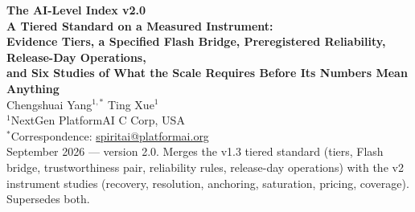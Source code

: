 \documentclass[11pt]{article}
\theoremstyle{definition}
\begin{document}
\begin{center}
{\LARGE\bfseries The AI-Level Index v2.0}\\[6pt]
{\large\bfseries A Tiered Standard on a Measured Instrument:\\[2pt] Evidence Tiers, a Specified Flash Bridge, Preregistered Reliability, Release-Day Operations,\\[2pt] and Six Studies of What the Scale Requires Before Its Numbers Mean Anything}\\[14pt]
{\large Chengshuai Yang$^{1,*}$ \quad Ting Xue$^{1}$}\\[5pt]
{\normalsize $^{1}$NextGen PlatformAI C Corp, USA}\\[4pt]
{\normalsize $^{*}$Correspondence: \href{mailto:spiritai@platformai.org}{spiritai@platformai.org}}\\[10pt]
{\small September 2026 --- version 2.0. Merges the v1.3 tiered standard (tiers, Flash bridge, trustworthiness pair, reliability rules, release-day operations) with the v2 instrument studies (recovery, resolution, anchoring, saturation, pricing, coverage). Supersedes both.}
\end{center}
\end{document}
